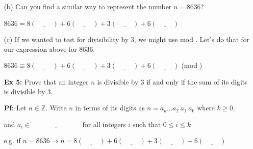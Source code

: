 \documentclass[fleqn]{article}
\theoremstyle{definition}
\begin{document}
\vspace{.25cm}

(b) Can you find a similar way to represent the number $n=8636$? 

\vspace{.25cm}
\hspace{1cm} $8636 = 8(\underline{\hspace{1cm}}) + 6(\underline{\hspace{1cm}})+ 3(\underline{\hspace{1cm}}) + 6(\underline{\hspace{1cm}})$

\vspace{.25cm}
(c) If we wanted to test for divisibility by 3, we might use mod \underline{\hspace{1cm}}. Let's do that for our expression above for 8636. 

\vspace{.25cm}
\hspace{1cm} $8636 \equiv 8(\underline{\hspace{1cm}}) + 6(\underline{\hspace{1cm}})+ 3(\underline{\hspace{1cm}}) + 6(\underline{\hspace{1cm}}) $ (mod \hspace{.75cm})


\newpage


\textbf{Ex 5:} Prove that an integer $n$ is divisible by $3$ if and only if the sum of its digits is divisible by $3$. 

\vspace{.25cm}
\textbf{Pf:} Let $n \in \mathbb{Z}$. Write $n$ in terms of its digits as \hspace{.25cm} $n=a_k \ldots a_2 \ a_1 \ a_0$ \hspace{.25cm} where $k \geq 0$,

\vspace{.25cm} 
and $a_i \in \underline{\hspace{3cm}}$ for all integers $i$ such that $0 \leq i \leq k$

\vspace{.5cm}
	\hspace{1cm} e.g. if $n=8636 \Longrightarrow n = 8(\underline{\hspace{1cm}}) + 6(\underline{\hspace{1cm}})+ 3(\underline{\hspace{1cm}}) + 6(\underline{\hspace{1cm}})$ 
\end{document}
